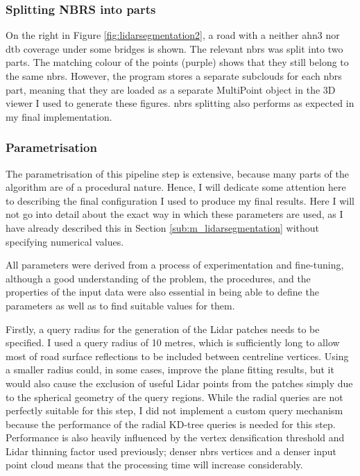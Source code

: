 \subsubsection{Splitting NBRS into parts}

On the right in Figure \ref{fig:lidarsegmentation2}, a road with a neither \ac{ahn3} nor \ac{dtb} coverage under some bridges is shown. The relevant \ac{nbrs} was split into two parts. The matching colour of the points (purple) shows that they still belong to the same \ac{nbrs}. However, the program stores a separate subclouds for each \ac{nbrs} part, meaning that they are loaded as a separate MultiPoint object in the 3D viewer I used to generate these figures. \ac{nbrs} splitting also performs as expected in my final implementation.

\subsubsection{Parametrisation}

The parametrisation of this pipeline step is extensive, because many parts of the algorithm are of a procedural nature. Hence, I will dedicate some attention here to describing the final configuration I used to produce my final results. Here I will not go into detail about the exact way in which these parameters are used, as I have already described this in Section \ref{sub:m_lidarsegmentation} without specifying numerical values.

All parameters were derived from a process of experimentation and fine-tuning, although a good understanding of the problem, the procedures, and the properties of the input data were also essential in being able to define the parameters as well as to find suitable values for them.

Firstly, a query radius for the generation of the Lidar patches needs to be specified. I used a query radius of 10 metres, which is sufficiently long to allow most of road surface reflections to be included between centreline vertices. Using a smaller radius could, in some cases, improve the plane fitting results, but it would also cause the exclusion of useful Lidar points from the patches simply due to the spherical geometry of the query regions. While the radial queries are not perfectly suitable for this step, I did not implement a custom query mechanism because the performance of the radial KD-tree queries is needed for this step. Performance is also heavily influenced by the vertex densification threshold and Lidar thinning factor used previously; denser \ac{nbrs} vertices and a denser input point cloud means that the processing time will increase considerably.

